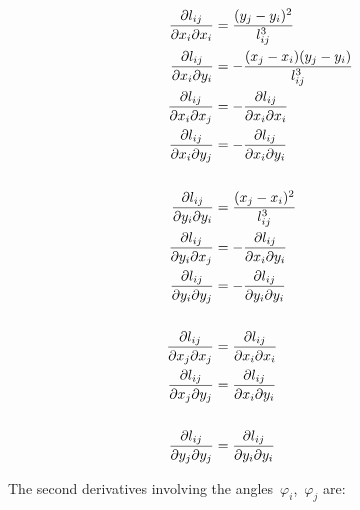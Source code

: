\begin{align}
\frac{\partial l_{ij}}{\partial x_i \partial x_i} &= \frac{(y_j - y_i)^2}{l_{ij}^3} \\
\frac{\partial l_{ij}}{\partial x_i \partial y_i} &= -\frac{(x_j - x_i)(y_j - y_i)}{l_{ij}^3} \\
\frac{\partial l_{ij}}{\partial x_i \partial x_j} &= -\frac{\partial l_{ij}}{\partial x_i \partial x_i} \\
\frac{\partial l_{ij}}{\partial x_i \partial y_j} &= -\frac{\partial l_{ij}}{\partial x_i \partial y_i} \\
\notag \\
\frac{\partial l_{ij}}{\partial y_i \partial y_i} &= \frac{(x_j - x_i)^2}{l_{ij}^3} \\
\frac{\partial l_{ij}}{\partial y_i \partial x_j} &= -\frac{\partial l_{ij}}{\partial x_i \partial y_i} \\
\frac{\partial l_{ij}}{\partial y_i \partial y_j} &= -\frac{\partial l_{ij}}{\partial y_i \partial y_i} \\
\notag \\
\frac{\partial l_{ij}}{\partial x_j \partial x_j} &= \frac{\partial l_{ij}}{\partial x_i \partial x_i} \\
\frac{\partial l_{ij}}{\partial x_j \partial y_j} &= \frac{\partial l_{ij}}{\partial x_i \partial y_i} \\
\notag \\
\frac{\partial l_{ij}}{\partial y_j \partial y_j} &= \frac{\partial l_{ij}}{\partial y_i \partial y_i}
\end{align}

\newpage
The second derivatives involving the angles~$\varphi_i$,~$\varphi_j$ are:

